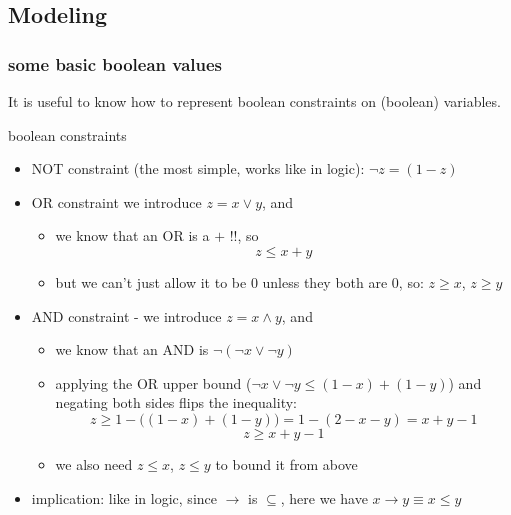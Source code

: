 \documentclass[a4paper, 11pt]{report}
\begin{document}
\subsection{Modeling}

\subsubsection*{some basic boolean values}
It is useful to know how to represent boolean constraints on (boolean) variables.

\begin{gframe}{boolean constraints}
\begin{itemize}
    \item NOT constraint (the most simple, works like in logic): $\neg z = (1- z)$
    \item OR constraint we introduce $z = x \lor y$, and
        \begin{itemize}
            \item we know that an OR is a $+$ !!, so 
            $$z \leq x + y$$
            \item but we can't just allow it to be $0$ unless they both are $0$, so: $z \geq x$, $z \geq y$
        \end{itemize}

    \item AND constraint - we introduce $z = x \land y$, and
        \begin{itemize}
\item we know that an AND is $\neg(\neg x \lor \neg y)$
\item applying the OR upper bound ($\neg x \lor \neg y \leq (1-x) + (1-y)$) and negating both sides flips the inequality:
    $$z \geq 1 - \big((1-x) + (1-y)\big) = 1 - (2 - x - y) = x + y - 1$$
    $$z \geq x + y - 1$$
\item we also need $z \leq x$, $z \leq y$ to bound it from above
        \end{itemize}
            \item implication: like in logic, since $\to $ is $\subseteq $, here we have $x \to y \equiv x \leq y$ 
\end{itemize}
\end{gframe}
\end{document}
